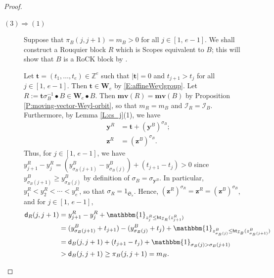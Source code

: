 \documentclass[11pt,a4paper,reqno]{amsart}
\numberwithin{equation}{section}
\theoremstyle{plain}
\theoremstyle{definition}
\theoremstyle{remark}
\numberwithin{equation}{section}
\newcommand{\bbone}{\mathbbm{1}}
\newcommand{\br}{\mathbf{r}}
\newcommand{\bt}{\mathbf{t}}
\newcommand{\by}{\mathbf{y}}
\newcommand{\bz}{\mathbf{z}}
\newcommand{\mv}{\mathbf{mv}}
\newcommand{\ZZ}{\mathbb{Z}}
\newcommand{\AW}{\mathbf{W}}
\newcommand{\sym}[1]{\mathfrak{S}_{#1}}
\newcommand{\DDot}[1]{\mathrel{\overset{#1}{\bullet}}}
\newcommand{\CDot}[1]{\mathrel{\overset{#1}{\circ}}}
\newcommand{\Ht}{\mathsf{ht}}
\newcommand{\II}{\mathcal{I}}
\newcommand{\dd}{\mathsf{d}}
\begin{document}
\begin{proof}
\begin{description}


\item[$(3) \Rightarrow (1)$]
Suppose that $\pi_B(j,j+1) = m_B>0$ for all $j \in [1,\,e-1]$.
We shall construct a Rouquier block $R$ which is Scopes equivalent to $B$; this will show that $B$ is a RoCK block by \cite[Proposition 4.6]{Webster}.

Let $\bt = (t_1,\dotsc, t_e) \in \ZZ^e$ such that $|\bt| = 0$ and $t_{j+1} > t_j$ for all $j \in [1,\, e-1]$.
Then $\bt \in \AW_e$ by \eqref{E:affineWeylgroup}.
Let $R := \bt \sigma_B^{-1} \DDot{} B \in \AW_e \DDot{} B$.
Then $\mv(R) = \mv(B)$ 
by Proposition \ref{P:moving-vector-Weyl-orbit}, so that $m_R = m_B$ and $\II_{R} = \II_B$.
Furthermore, by Lemma \ref{L:cs_j}(1), we have
\begin{align*}
\by^{R} &= \bt + (\by^B)^{\sigma_B}; \\
\bz^{R} &= (\bz^B)^{\sigma_B}.
\end{align*}
Thus, for $j \in [1,\,e-1]$, we have
$y^{R}_{j+1} - y^{R}_j = (y^B_{\sigma_B(j+1)} - y^B_{\sigma_B(j)}) + (t_{j+1} - t_j) > 0$
since $y^B_{\sigma_B(j+1)} \geq y^B_{\sigma_B(j)}$ by definition of $\sigma_B = \sigma_{\by^B}$.
In particular, 
$y^{R}_1 < y^{R}_2 < \dotsb < y^{R}_e$, so that $\sigma_{R} = 1_{\sym{e}}$.
Hence, $(\bz^{R})^{\sigma_{R}} = \bz^{R} = (\bz^B)^{\sigma_B}$, and for $j \in [1,\,e-1]$,
\begin{align*}
\dd_{R}(j,j+1) &= y^{R}_{j+1} - y^{R}_j + \bbone_{z^{R}_j \leq \Ht_{\II_R} (z^{R}_{j+1})} \\
&= (y^B_{\sigma_B(j+1)} + t_{j+1}) - (y^B_{\sigma_B(j)}  + t_j) + \bbone_{z^B_{\sigma_B(j)} \leq \Ht_{\II_B} (z^B_{\sigma_B(j+1)})} \\
&= \dd_B(j,j+1) + (t_{j+1} -t_j) + \bbone_{\sigma_B(j) > \sigma_B(j+1)} \\
&> \dd_B(j,j+1) \geq \pi_B(j,j+1) = m_B.
\end{align*}
%

\end{description}
\end{proof}
\end{document}
